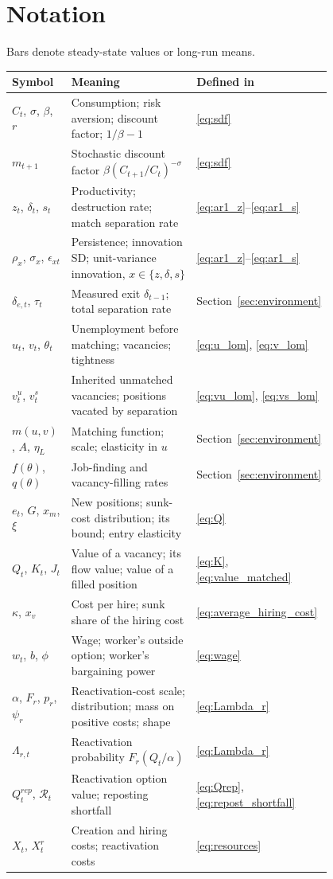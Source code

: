 \documentclass[authoryear, review, 12pt]{elsarticle}
\begin{document}
\section{Notation}\label{app:notation}
Bars denote steady-state values or long-run means.
{\small
\begin{longtable}{@{}>{\raggedright\arraybackslash}p{0.2\linewidth}>{\raggedright\arraybackslash}p{0.6\linewidth}l@{}}
\toprule
Symbol & Meaning & Defined in \\
\midrule
\endhead
\bottomrule
\endfoot
$C_t$, $\sigma$, $\beta$, $r$ & Consumption; risk aversion; discount factor; $1/\beta-1$ & \eqref{eq:sdf} \\
$m_{t+1}$ & Stochastic discount factor $\beta(C_{t+1}/C_t)^{-\sigma}$ & \eqref{eq:sdf} \\
$z_t$, $\delta_t$, $s_t$ & Productivity; destruction rate; match separation rate & \eqref{eq:ar1_z}--\eqref{eq:ar1_s} \\
$\rho_x$, $\sigma_x$, $\epsilon_{xt}$ & Persistence; innovation SD; unit-variance innovation, $x\in\{z,\delta,s\}$ & \eqref{eq:ar1_z}--\eqref{eq:ar1_s} \\
$\delta_{e,t}$, $\tau_t$ & Measured exit $\delta_{t-1}$; total separation rate & Section~\ref{sec:environment} \\
$u_t$, $v_t$, $\theta_t$ & Unemployment before matching; vacancies; tightness & \eqref{eq:u_lom}, \eqref{eq:v_lom} \\
$v^u_t$, $v^s_t$ & Inherited unmatched vacancies; positions vacated by separation & \eqref{eq:vu_lom}, \eqref{eq:vs_lom} \\
$m(u,v)$, $A$, $\eta_L$ & Matching function; scale; elasticity in $u$ & Section~\ref{sec:environment} \\
$f(\theta)$, $q(\theta)$ & Job-finding and vacancy-filling rates & Section~\ref{sec:environment} \\
$e_t$, $G$, $x_m$, $\xi$ & New positions; sunk-cost distribution; its bound; entry elasticity & \eqref{eq:Q} \\
$Q_t$, $K_t$, $J_t$ & Value of a vacancy; its flow value; value of a filled position & \eqref{eq:K}, \eqref{eq:value_matched} \\
$\kappa$, $x_v$ & Cost per hire; sunk share of the hiring cost & \eqref{eq:average_hiring_cost} \\
$w_t$, $b$, $\phi$ & Wage; worker's outside option; worker's bargaining power & \eqref{eq:wage} \\
$\alpha$, $F_r$, $p_r$, $\psi_r$ & Reactivation-cost scale; distribution; mass on positive costs; shape & \eqref{eq:Lambda_r} \\
$\Lambda_{r,t}$ & Reactivation probability $F_r(Q_t/\alpha)$ & \eqref{eq:Lambda_r} \\
$Q_t^{rep}$, $\mathcal{R}_t$ & Reactivation option value; reposting shortfall & \eqref{eq:Qrep}, \eqref{eq:repost_shortfall} \\
$X_t$, $X_t^r$ & Creation and hiring costs; reactivation costs & \eqref{eq:resources} \\
\end{longtable}
}
\end{document}
